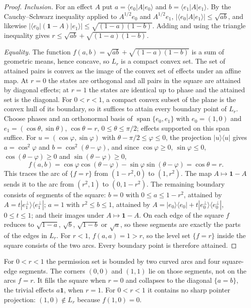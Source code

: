 \documentclass[12pt,a4paper]{article}
\begin{document}
\begin{proof}
\emph{Inclusion.} For an effect $A$ put $a=\langle e_0|A|e_0\rangle$ and $b=\langle e_1|A|e_1\rangle$. By the Cauchy--Schwarz inequality applied to $A^{1/2}e_0$ and $A^{1/2}e_1$, $|\langle e_0|A|e_1\rangle|\le\sqrt{ab}$, and likewise $|\langle e_0|(\mathbf 1-A)|e_1\rangle|\le\sqrt{(1-a)(1-b)}$. Adding and using the triangle inequality gives $r\le\sqrt{ab}+\sqrt{(1-a)(1-b)}$.

\emph{Equality.} The function $f(a,b)=\sqrt{ab}+\sqrt{(1-a)(1-b)}$ is a sum of geometric means, hence concave, so $L_r$ is a compact convex set. The set of attained pairs is convex as the image of the convex set of effects under an affine map. At $r=0$ the states are orthogonal and all pairs in the square are attained by diagonal effects; at $r=1$ the states are identical up to phase and the attained set is the diagonal. For $0<r<1$, a compact convex subset of the plane is the convex hull of its boundary, so it suffices to attain every boundary point of $L_r$. Choose phases and an orthonormal basis of $\operatorname{span}\{e_0,e_1\}$ with $e_0=(1,0)$ and $e_1=(\cos\theta,\sin\theta)$, $\cos\theta=r$, $0\le\theta\le\pi/2$; effects supported on this span suffice. For $u=(\cos\varphi,\sin\varphi)$ with $\theta-\pi/2\le\varphi\le0$, the projection $|u\rangle\langle u|$ gives $a=\cos^2\varphi$ and $b=\cos^2(\theta-\varphi)$, and since $\cos\varphi\ge0$, $\sin\varphi\le0$, $\cos(\theta-\varphi)\ge0$ and $\sin(\theta-\varphi)\ge0$,
\[
f(a,b)=\cos\varphi\cos(\theta-\varphi)-\sin\varphi\sin(\theta-\varphi)=\cos\theta=r .
\]
This traces the arc of $\{f=r\}$ from $(1-r^2,0)$ to $(1,r^2)$. The map $A\mapsto\mathbf 1-A$ sends it to the arc from $(r^2,1)$ to $(0,1-r^2)$. The remaining boundary consists of segments of the square: $b=0$ with $0\le a\le1-r^2$, attained by $A=t|e_1^\perp\rangle\langle e_1^\perp|$; $a=1$ with $r^2\le b\le1$, attained by $A=|e_0\rangle\langle e_0|+t|e_0^\perp\rangle\langle e_0^\perp|$, $0\le t\le1$; and their images under $A\mapsto\mathbf 1-A$. On each edge of the square $f$ reduces to $\sqrt{1-a}$, $\sqrt b$, $\sqrt{1-b}$ or $\sqrt a$, so these segments are exactly the parts of the edges in $L_r$. For $r<1$, $f(a,a)=1>r$, so the level set $\{f=r\}$ inside the square consists of the two arcs. Every boundary point is therefore attained.
\end{proof}

For $0<r<1$ the permission set is bounded by two curved arcs and four square-edge segments. The corners $(0,0)$ and $(1,1)$ lie on those segments, not on the arcs $f=r$. It fills the square when $r=0$ and collapses to the diagonal $\{a=b\}$, the trivial effects $a\mathbf 1$, when $r=1$. For $0<r<1$ it contains no sharp pointer projection: $(1,0)\notin L_r$ because $f(1,0)=0$.
\end{document}

